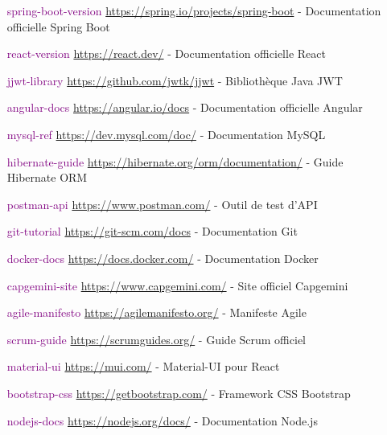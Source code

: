 \documentclass[12pt,a4paper,twoside,openright]{report}
\begin{document}
\begin{itemize}
\item[\textcolor{purple}{spring-boot-version}] \url{https://spring.io/projects/spring-boot} - Documentation officielle Spring Boot
\item[\textcolor{purple}{react-version}] \url{https://react.dev/} - Documentation officielle React
\item[\textcolor{purple}{jjwt-library}] \url{https://github.com/jwtk/jjwt} - Bibliothèque Java JWT
\item[\textcolor{purple}{angular-docs}] \url{https://angular.io/docs} - Documentation officielle Angular
\item[\textcolor{purple}{mysql-ref}] \url{https://dev.mysql.com/doc/} - Documentation MySQL
\item[\textcolor{purple}{hibernate-guide}] \url{https://hibernate.org/orm/documentation/} - Guide Hibernate ORM
\item[\textcolor{purple}{postman-api}] \url{https://www.postman.com/} - Outil de test d'API
\item[\textcolor{purple}{git-tutorial}] \url{https://git-scm.com/docs} - Documentation Git
\item[\textcolor{purple}{docker-docs}] \url{https://docs.docker.com/} - Documentation Docker
\item[\textcolor{purple}{capgemini-site}] \url{https://www.capgemini.com/} - Site officiel Capgemini
\item[\textcolor{purple}{agile-manifesto}] \url{https://agilemanifesto.org/} - Manifeste Agile
\item[\textcolor{purple}{scrum-guide}] \url{https://scrumguides.org/} - Guide Scrum officiel
\item[\textcolor{purple}{material-ui}] \url{https://mui.com/} - Material-UI pour React
\item[\textcolor{purple}{bootstrap-css}] \url{https://getbootstrap.com/} - Framework CSS Bootstrap
\item[\textcolor{purple}{nodejs-docs}] \url{https://nodejs.org/docs/} - Documentation Node.js
\end{itemize}
\end{document}

